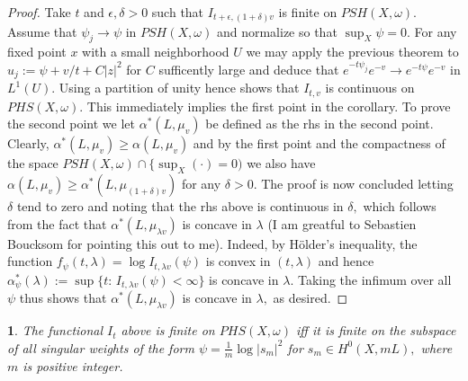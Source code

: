 \documentclass[11pt,oneside,english]{amsart}
\numberwithin{equation}{section}
\numberwithin{figure}{section}
\theoremstyle{plain}
\theoremstyle{plain}
\theoremstyle{plain}
\newtheorem{lem}[thm]{\protect\lemmaname}
\theoremstyle{plain}
\theoremstyle{remark}
\theoremstyle{definition}
\providecommand{\lemmaname}{Lemma}
\begin{document}
\begin{proof}
Take $t$ and $\epsilon,\delta>0$ such that $I_{t+\epsilon,(1+\delta)v}$
is finite on $PSH(X,\omega).$ Assume that $\psi_{j}\rightarrow\psi$
in $PSH(X,\omega)$ and normalize so that $\sup_{X}\psi=0.$ For any
fixed point $x$ with a small neighborhood $U$ we may apply the previous
theorem to $u_{j}:=\psi+v/t+C|z|^{2}$ for $C$ sufficently large
and deduce that $e^{-t\psi_{j}}e^{-v}\rightarrow e^{-t\psi}e^{-v}$
in $L^{1}(U).$ Using a partition of unity hence shows that $I_{t,v}$
is continuous on $PHS(X,\omega).$ This immediately implies the first
point in the corollary. To prove the second point we let $\alpha^{*}(L,\mu_{v})$
be defined as the rhs in the second point. Clearly, $\alpha^{*}(L,\mu_{v})\geq\alpha(L,\mu_{v})$
and by the first point and the compactness of the space $PSH(X,\omega)\cap\{\sup_{X}(\cdot)=0)$
we also have $\alpha(L,\mu_{v})\geq\alpha^{*}(L,\mu_{(1+\delta)v})$
for any $\delta>0.$ The proof is now concluded letting $\delta$
tend to zero and noting that the rhs above is continuous in $\delta,$
which follows from the fact that $\alpha^{*}(L,\mu_{\lambda v})$
is concave in $\lambda$ (I am greatful to Sebastien Boucksom for
pointing this out to me). Indeed, by Hölder's inequality, the function
$f_{\psi}(t,\lambda)=\log I_{t,\lambda v}(\psi)$ is convex in $(t,\lambda)$
and hence $\alpha_{\psi}^{*}(\lambda):=\sup\{t:\, I_{t,\lambda v}(\psi)<\infty\}$
is concave in $\lambda.$ Taking the infimum over all $\psi$ thus
shows that $\alpha^{*}(L,\mu_{\lambda v})$ is concave in $\lambda,$
as desired. \end{proof}
\begin{lem}
The functional $I_{t}$ above is finite on $PHS(X,\omega)$ iff it
is finite on the subspace of all singular weights of the form $\psi=\frac{1}{m}\log|s_{m}|^{2}$
for $s_{m}\in H^{0}(X,mL),$ where $m$ is positive integer. \end{lem}
\end{document}
